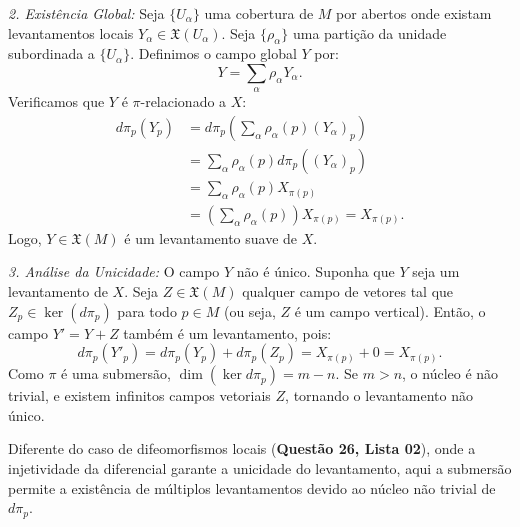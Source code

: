 {	\textit{2. Existência Global:}
	Seja $\{U_\alpha\}$ uma cobertura de $M$ por abertos onde existam levantamentos locais $Y_\alpha \in \mathfrak{X}(U_\alpha)$. Seja $\{\rho_\alpha\}$ uma partição da unidade subordinada a $\{U_\alpha\}$. Definimos o campo global $Y$ por:
	\begin{equation*}
		Y = \sum_\alpha \rho_\alpha Y_\alpha.
	\end{equation*}
	Verificamos que $Y$ é $\pi$-relacionado a $X$:
	\begin{align*}
		d\pi_p(Y_p) &= d\pi_p \left( \sum_\alpha \rho_\alpha(p) (Y_\alpha)_p \right) \\
		&= \sum_\alpha \rho_\alpha(p) d\pi_p((Y_\alpha)_p) \\
		&= \sum_\alpha \rho_\alpha(p) X_{\pi(p)} \\
		&= \left( \sum_\alpha \rho_\alpha(p) \right) X_{\pi(p)} = X_{\pi(p)}.
	\end{align*}
	Logo, $Y \in \mathfrak{X}(M)$ é um levantamento suave de $X$.
	
	\textit{3. Análise da Unicidade:}
	O campo $Y$ não é único. Suponha que $Y$ seja um levantamento de $X$. Seja $Z \in \mathfrak{X}(M)$ qualquer campo de vetores tal que $Z_p \in \ker(d\pi_p)$ para todo $p \in M$ (ou seja, $Z$ é um campo vertical). Então, o campo $Y' = Y + Z$ também é um levantamento, pois:
	\begin{equation*}
		d\pi_p(Y'_p) = d\pi_p(Y_p) + d\pi_p(Z_p) = X_{\pi(p)} + 0 = X_{\pi(p)}.
	\end{equation*}
	Como $\pi$ é uma submersão, $\dim(\ker d\pi_p) = m - n$. Se $m > n$, o núcleo é não trivial, e existem infinitos campos vetoriais $Z$, tornando o levantamento não único.
}
Diferente do caso de difeomorfismos locais (\textbf{Questão 26, Lista 02}), onde a injetividade da diferencial garante a unicidade do levantamento, aqui a submersão permite a existência de múltiplos levantamentos devido ao núcleo não trivial de $d\pi_p$.


